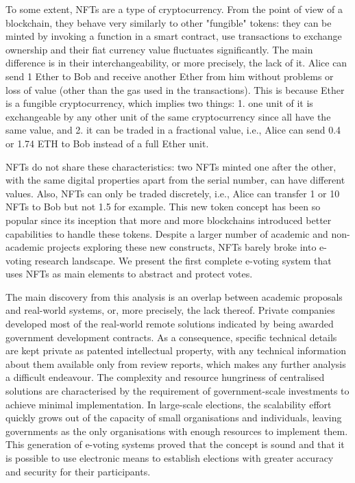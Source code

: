 To some extent, NFTs are a type of cryptocurrency. From the point of view of a blockchain, they behave very similarly to other "fungible" tokens: they can be minted by invoking a function in a smart contract, use transactions to exchange ownership and their fiat currency value fluctuates significantly. The main difference is in their interchangeability, or more precisely, the lack of it. Alice can send 1 Ether to Bob and receive another Ether from him without problems or loss of value (other than the gas used in the transactions). This is because Ether is a fungible cryptocurrency, which implies two things: 1. one unit of it is exchangeable by any other unit of the same cryptocurrency since all have the same value, and 2. it can be traded in a fractional value, i.e., Alice can send 0.4 or 1.74 ETH to Bob instead of a full Ether unit.
\par
NFTs do not share these characteristics: two NFTs minted one after the other, with the same digital properties apart from the serial number, can have different values. Also, NFTs can only be traded discretely, i.e., Alice can transfer 1 or 10 NFTs to Bob but not 1.5 for example.
This new token concept has been so popular since its inception that more and more blockchains introduced better capabilities to handle these tokens. Despite a larger number of academic and non-academic projects exploring these new constructs, NFTs barely broke into e-voting research landscape. We present the first complete e-voting system that uses NFTs as main elements to abstract and protect votes.


The main discovery from this analysis is an overlap between academic proposals and real-world systems, or, more precisely, the lack thereof. Private companies developed most of the real-world remote solutions indicated by being awarded government development contracts. As a consequence, specific technical details are kept private as patented intellectual property, with any technical information about them available only from review reports, which makes any further analysis a difficult endeavour. The complexity and resource hungriness of centralised solutions are characterised by the requirement of government-scale investments to achieve minimal implementation. In large-scale elections, the scalability effort quickly grows out of the capacity of small organisations and individuals, leaving governments as the only organisations with enough resources to implement them. This generation of e-voting systems proved that the concept is sound and that it is possible to use electronic means to establish elections with greater accuracy and security for their participants.